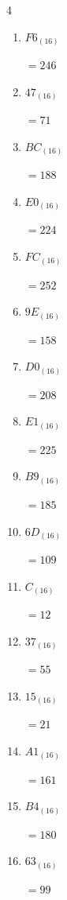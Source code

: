 \begin{multicols}{4}
\begin{enumerate}
  \item $F6_{(16)}$

        $=246$

  \item $47_{(16)}$

        $=71$

  \item $BC_{(16)}$

        $=188$

  \item $E0_{(16)}$

        $=224$

  \item $FC_{(16)}$

        $=252$

  \item $9E_{(16)}$

        $=158$

  \item $D0_{(16)}$

        $=208$

  \item $E1_{(16)}$

        $=225$

  \item $B9_{(16)}$

        $=185$

\columnbreak %

\resetques

  \item $6D_{(16)}$

        $=109$

  \item $C_{(16)}$

        $=12$

  \item $37_{(16)}$

        $=55$

  \item $15_{(16)}$

        $=21$

  \item $A1_{(16)}$

        $=161$

  \item $B4_{(16)}$

        $=180$

  \item $63_{(16)}$

        $=99$


\end{enumerate}
\end{multicols}
